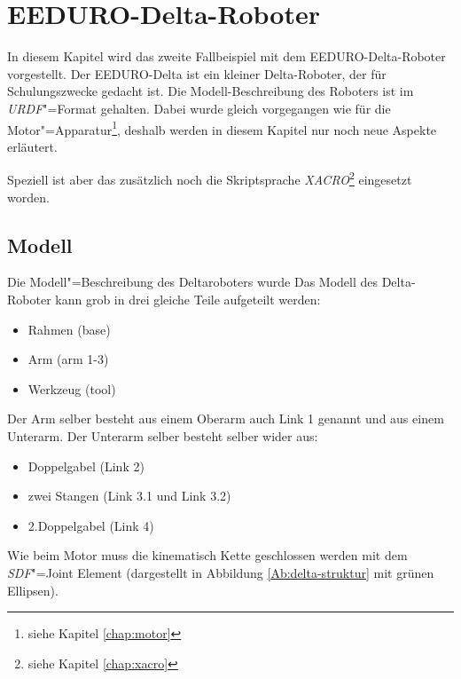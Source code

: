 \chapter{EEDURO-Delta-Roboter}


In diesem Kapitel wird das zweite Fallbeispiel mit dem EEDURO-Delta-Roboter vorgestellt.
Der EEDURO-Delta ist ein kleiner Delta-Roboter, der für Schulungszwecke gedacht ist.
Die Modell-Beschreibung des Roboters ist im \textit{URDF}"=Format gehalten.
Dabei wurde gleich vorgegangen wie für die Motor"=Apparatur\footnote{siehe Kapitel \ref{chap:motor}}, deshalb werden in diesem Kapitel nur noch neue Aspekte erläutert.

Speziell ist aber das zusätzlich noch die Skriptsprache \textit{XACRO}\footnote{siehe Kapitel \ref{chap:xacro}} eingesetzt worden.

\section{Modell}
\label{chap:delta-modell}
Die Modell"=Beschreibung des Deltaroboters wurde %
Das Modell des Delta-Roboter kann grob in drei gleiche Teile aufgeteilt werden:
\begin{itemize}
\item Rahmen (base)
\item Arm (arm 1-3)
\item Werkzeug (tool)
\end{itemize}

Der Arm selber besteht aus einem Oberarm auch Link 1 genannt und aus einem Unterarm.
Der Unterarm selber besteht selber wider aus:
\begin{itemize}
\item Doppelgabel (Link 2)
\item zwei Stangen (Link 3.1 und Link 3.2)
\item 2.Doppelgabel (Link 4)
\end{itemize}


Wie beim Motor muss die kinematisch Kette geschlossen werden mit dem \textit{SDF}"=Joint Element (dargestellt in Abbildung \ref{Ab:delta-struktur} mit grünen Ellipsen).


